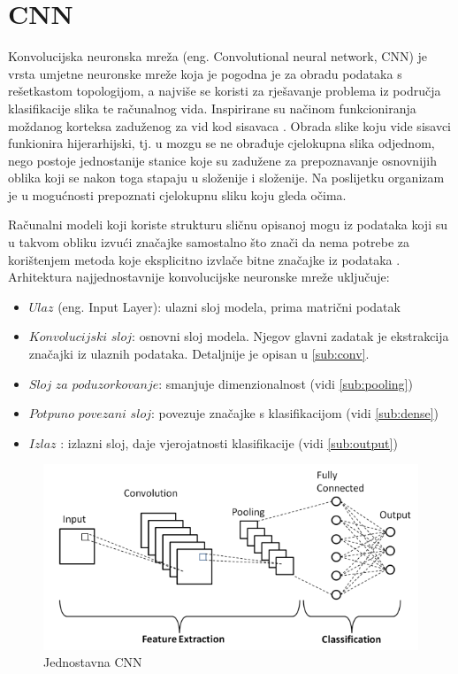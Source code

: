 \section{CNN}

Konvolucijska neuronska mreža (eng. Convolutional neural network, CNN) je vrsta 
umjetne neuronske mreže koja je pogodna je za obradu podataka s rešetkastom
topologijom, a najviše se koristi za rješavanje problema iz područja klasifikacije slika
te računalnog vida. Inspirirane su načinom funkcioniranja moždanog korteksa 
zaduženog za vid kod sisavaca \cite{pycodemates}. Obrada slike koju vide sisavci
funkionira hijerarhijski, tj. u mozgu se ne obrađuje cjelokupna slika odjednom,
nego postoje jednostanije stanice koje su zadužene za prepoznavanje osnovnijih
oblika koji se nakon toga stapaju u složenije i složenije. Na poslijetku 
organizam je u mogućnosti prepoznati cjelokupnu sliku koju gleda očima.

Računalni modeli koji koriste strukturu sličnu opisanoj mogu iz
podataka koji su u takvom obliku izvući značajke samostalno što znači da nema
potrebe za korištenjem metoda koje eksplicitno izvlače bitne značajke iz podataka
\cite{1}. Arhitektura najjednostavnije konvolucijske neuronske mreže
uključuje:

\begin{itemize}
    \item \(Ulaz\) (eng. Input Layer): ulazni sloj modela, prima matrični podatak
    \item \(Konvolucijski\) \(sloj\): osnovni sloj modela. Njegov glavni zadatak
          je ekstrakcija značajki iz ulaznih podataka. Detaljnije je opisan u \ref{sub:conv}.
    \item \(Sloj\) \(za\) \(poduzorkovanje\): smanjuje dimenzionalnost (vidi \ref{sub:pooling})
    \item \(Potpuno\) \(povezani\) \(sloj\): povezuje značajke s klasifikacijom (vidi \ref{sub:dense})
    \item \(Izlaz\) : izlazni sloj, daje vjerojatnosti klasifikacije (vidi \ref{sub:output})
\end{itemize}

\begin{figure}[htb]
    \centering
    \includegraphics[width=0.5\linewidth]{Chapters/neuronska_mreza/CNN/cnn.png} 
    \caption{Jednostavna CNN \cite{1}}
    \label{pic:cnn}
\end{figure}

